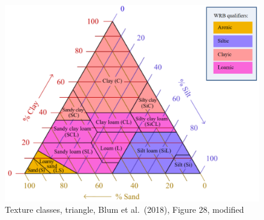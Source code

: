 \documentclass[
  letterpaper,
  DIV=11,
  numbers=noendperiod]{scrreprt}
\begin{document}
\begin{figure}

{\centering \includegraphics{./figure_8-13.png}

}

\caption{Texture classes, triangle, Blum et al.~(2018), Figure 28,
modified}

\end{figure}
\end{document}
